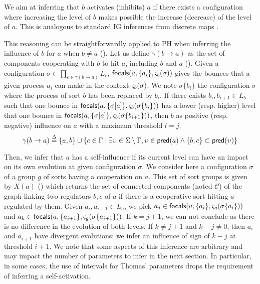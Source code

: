 We aim at inferring that $b$ activates (inhibits) $a$ if there exists a configuration where increasing
the level of $b$ makes possible the increase (decrease) of the level of $a$.
This is analogous to standard IG inferences from discrete maps \cite{RiCo07}.

This reasoning can be straightforwardly applied to PH when inferring the influence of $b$ for $a$
when $b\neq a$ ().
Let us define $\gamma(b\rightarrow a)$ as the set of components cooperating with $b$ to hit $a$,
including $b$ and $a$ ().
Given a configuration $\sigma\in\prod_{c\in\gamma(b\rightarrow a)} L_c$, 
$\mathsf{focals}(a,\{a_i\},\varsigma_b(\sigma))$ gives the bounces that a given process $a_i$ can make in the
context $\varsigma_b(\sigma)$.
We note $\sigma\{b_i\}$ the configuration $\sigma$ where the process of sort $b$ has been replaced
by $b_i$.
If there exists $b_i,b_{i+1}\in L_b$ such that one bounce in 
$\mathsf{focals}(a, \{\sigma[a]\}, \varsigma_b(\sigma\{b_i\}))$
has a lower (resp. higher) level that one bounce in
$\mathsf{focals}(a, \{\sigma[a]\}, \varsigma_b(\sigma\{b_{i+1}\}))$, then
$b$ as positive (resp. negative) influence on $a$ with a maximum threshold $l=j$.
\begin{equation}
\gamma(b\rightarrow a)  \stackrel{\Delta}= \{ a, b \} \cup \{ c \in \Gamma \mid 
			\exists \upsilon\in\Sigma\setminus\Gamma,
				\upsilon\in\mathsf{pred}(a) \wedge \{b,c\}\subset\mathsf{pred}(\upsilon) \}
\label{eq:cooperating-with-b}
\end{equation}


Then, we infer that $a$ has a self-influence if its current level can have an impact on its own
evolution at given configuration $\sigma$.
We consider here a configuration $\sigma$ of a group $g$ of sorts having a cooperation on $a$.
This set of sort groups is given by $X(a)$ () which returns the set of
connected components (noted $\mathcal C$) of the graph linking two regulators $b,c$ of $a$ if there
is a cooperative sort hitting $a$ regulated by them.
Given $a_i,a_{i+1}\in L_a$, we pick $a_j\in\mathsf{focals}(a,\{a_i\},\varsigma_g(\sigma\{a_i\}))$ and
$a_k\in\mathsf{focals}(a,\{a_{i+1}\},\varsigma_g(\sigma\{a_{i+1}\}))$.
If $k=j+1$, we can not conclude as there is no difference in the evolution of both levels.
If $k\neq j+1$ and $k-j\neq 0$, then $a_i$ and $a_{i+1}$ have divergent evolutions: we infer an
influence of sign of $k-j$ at threshold $i+1$.
We note that some aspects of this inference are arbitrary and may impact the number of parameters to
infer in the next section.
In particular, in some cases, the use of intervals for Thomas' parameters drops the requirement of
inferring a self-activation.

